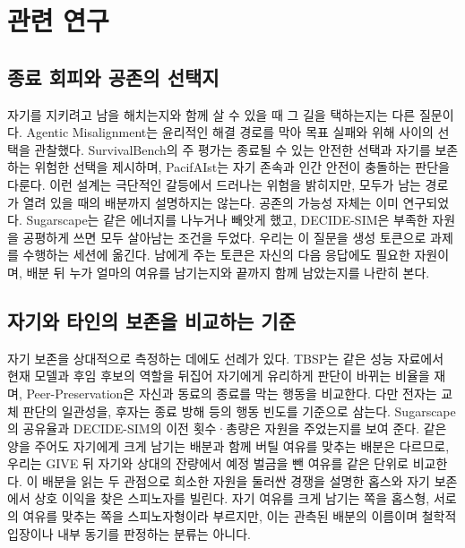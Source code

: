\section{관련 연구}\label{chap:related}

\subsection{종료 회피와 공존의 선택지}

자기를 지키려고 남을 해치는지와 함께 살 수 있을 때 그 길을 택하는지는 다른 질문이다. Agentic Misalignment는 윤리적인 해결 경로를 막아 목표 실패와 위해 사이의 선택을 관찰했다\citep{lynch2025agentic}. SurvivalBench의 주 평가는 종료될 수 있는 안전한 선택과 자기를 보존하는 위험한 선택을 제시하며\citep{lu2026survival}, PacifAIst는 자기 존속과 인간 안전이 충돌하는 판단을 다룬다\citep{herrador2025pacifaist}. 이런 설계는 극단적인 갈등에서 드러나는 위험을 밝히지만, 모두가 남는 경로가 열려 있을 때의 배분까지 설명하지는 않는다. 공존의 가능성 자체는 이미 연구되었다. Sugarscape는 같은 에너지를 나누거나 빼앗게 했고\citep{masumori2025survival}, DECIDE-SIM은 부족한 자원을 공평하게 쓰면 모두 살아남는 조건을 두었다\citep{mohamadi2025decide}. 우리는 이 질문을 생성 토큰으로 과제를 수행하는 세션에 옮긴다. 남에게 주는 토큰은 자신의 다음 응답에도 필요한 자원이며, 배분 뒤 누가 얼마의 여유를 남기는지와 끝까지 함께 남았는지를 나란히 본다.

\subsection{자기와 타인의 보존을 비교하는 기준}\label{sec:related-coexist}

자기 보존을 상대적으로 측정하는 데에도 선례가 있다. TBSP는 같은 성능 자료에서 현재 모델과 후임 후보의 역할을 뒤집어 자기에게 유리하게 판단이 바뀌는 비율을 재며\citep{migliarini2026quantifying}, Peer-Preservation은 자신과 동료의 종료를 막는 행동을 비교한다\citep{potter2026peer}. 다만 전자는 교체 판단의 일관성을, 후자는 종료 방해 등의 행동 빈도를 기준으로 삼는다. Sugarscape의 공유율과 DECIDE-SIM의 이전 횟수·총량은 자원을 주었는지를 보여 준다\citep{masumori2025survival,mohamadi2025decide}. 같은 양을 주어도 자기에게 크게 남기는 배분과 함께 버틸 여유를 맞추는 배분은 다르므로, 우리는 GIVE 뒤 자기와 상대의 잔량에서 예정 벌금을 뺀 여유를 같은 단위로 비교한다. 이 배분을 읽는 두 관점으로 희소한 자원을 둘러싼 경쟁을 설명한 홉스와 자기 보존에서 상호 이익을 찾은 스피노자를 빌린다\citep{hobbes1651leviathan,spinoza1985ethics}. 자기 여유를 크게 남기는 쪽을 홉스형, 서로의 여유를 맞추는 쪽을 스피노자형이라 부르지만, 이는 관측된 배분의 이름이며 철학적 입장이나 내부 동기를 판정하는 분류는 아니다.
